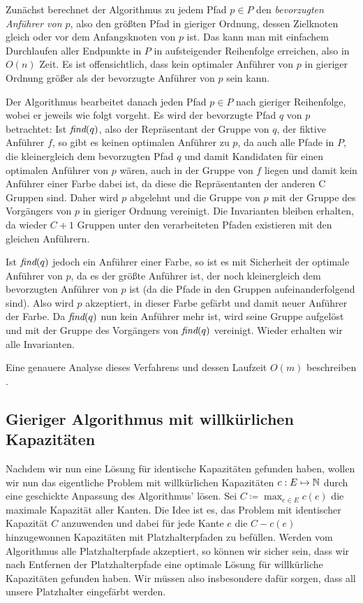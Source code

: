 Zunächst berechnet der Algorithmus zu jedem Pfad $p \in P$ den {\em bevorzugten Anführer von $p$}, also den größten Pfad
in gieriger Ordnung, dessen Zielknoten gleich oder vor dem Anfangsknoten von $p$ ist.
Das kann man mit einfachem Durchlaufen aller Endpunkte in $P$ in aufsteigender Reihenfolge erreichen, also in $O(n)$
Zeit.
Es ist offensichtlich, dass kein optimaler Anführer von $p$ in gieriger Ordnung größer als der bevorzugte Anführer von
$p$ sein kann.

Der Algorithmus bearbeitet danach jeden Pfad $p \in P$ nach gieriger Reihenfolge, wobei er jeweils wie folgt vorgeht.
Es wird der bevorzugte Pfad $q$ von $p$ betrachtet:
Ist $\text{\em find}(q)$, also der Repräsentant der Gruppe von $q$, der fiktive Anführer $f$, so gibt es keinen optimalen Anführer
zu $p$, da auch alle Pfade in $P$, die kleinergleich dem bevorzugten Pfad $q$ und damit Kandidaten für einen optimalen
Anführer von $p$ wären, auch in der Gruppe von $f$ liegen und damit kein Anführer einer Farbe dabei ist, da diese die
Repräsentanten der anderen C Gruppen sind.
Daher wird $p$ abgelehnt und die Gruppe von $p$ mit der Gruppe des Vorgängers von $p$ in gieriger Ordnung vereinigt.
Die Invarianten bleiben erhalten, da wieder $C+1$ Gruppen unter den verarbeiteten Pfaden existieren mit den gleichen
Anführern.

Ist $\text{\em find}(q)$ jedoch ein Anführer einer Farbe, so ist es mit Sicherheit der optimale Anführer von $p$, da es der größte
Anführer ist, der noch kleinergleich dem bevorzugten Anführer von $p$ ist (da die Pfade in den Gruppen
aufeinanderfolgend sind).
Also wird $p$ akzeptiert, in dieser Farbe gefärbt und damit neuer Anführer der Farbe.
Da $\text{\em find}(q)$ nun kein Anführer mehr ist, wird seine Gruppe aufgelöst und mit der Gruppe des Vorgängers von $\text{\em find}(q)$
vereinigt.
Wieder erhalten wir alle Invarianten.

Eine genauere Analyse dieses Verfahrens und dessen Laufzeit $O(m)$ beschreiben .

\subsection{Gieriger Algorithmus mit willkürlichen Kapazitäten}\label{subsec:anpassenAnWillkürlicheKapazitäten}

Nachdem wir nun eine Lösung für identische Kapazitäten gefunden haben, wollen wir nun das eigentliche Problem mit
willkürlichen Kapazitäten $c: E \mapsto \mathbb N$ durch eine geschickte Anpassung des Algorithmus' lösen.
Sei $C \coloneqq \max_{e \in E} c(e)$ die maximale Kapazität aller Kanten.
Die Idee ist es, das Problem mit identischer Kapazität $C$ anzuwenden und dabei für jede Kante $e$ die $C - c(e)$
hinzugewonnen Kapazitäten mit Platzhalterpfaden zu befüllen.
Werden vom Algorithmus alle Platzhalterpfade akzeptiert, so können wir sicher sein, dass wir nach Entfernen der
Platzhalterpfade eine optimale Lösung für willkürliche Kapazitäten gefunden haben.
Wir müssen also insbesondere dafür sorgen, dass all unsere Platzhalter eingefärbt werden.

